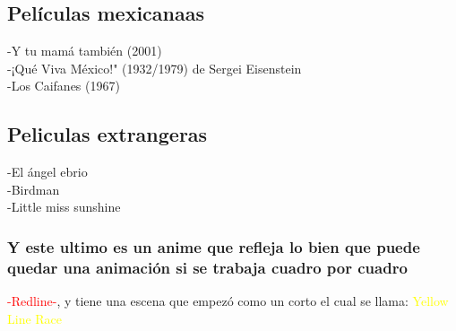 \documentclass[12pt,a4paper]{article}
\begin{document}
\subsection*{Películas mexicanaas}
{\bf{ 
-Y tu mamá también (2001)\\
-¡Qué Viva México!" (1932/1979) de Sergei Eisenstein\\
-Los Caifanes (1967)
\subsection*{Peliculas extrangeras}
-El ángel ebrio\\
-Birdman\\ %
-Little miss sunshine}}\subsubsection*{Y este ultimo es un anime que refleja lo bien que puede quedar una animación si se trabaja cuadro por cuadro}

\textcolor{red}{-Redline-}, y tiene una escena que empezó como un corto el cual se llama: \textcolor{yellow}{Yellow Line Race}
\end{document}

